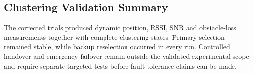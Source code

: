 \subsection{Clustering Validation Summary}

The corrected trials produced dynamic position, RSSI, SNR and obstacle-loss measurements together with complete clustering states. Primary selection remained stable, while backup reselection occurred in every run. Controlled handover and emergency failover remain outside the validated experimental scope and require separate targeted tests before fault-tolerance claims can be made.
